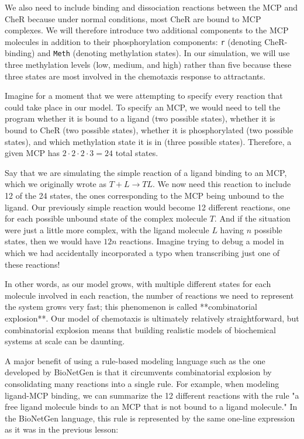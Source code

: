 We also need to include binding and dissociation reactions between the MCP and CheR because under normal conditions, most CheR are bound to MCP complexes.\citep{Lupas_1989} We will therefore introduce two additional components to the MCP molecules in addition to their phosphorylation components: \texttt{r} (denoting CheR-binding) and \texttt{Meth} (denoting methylation states). In our simulation, we will use three methylation levels (low, medium, and high) rather than five because these three states are most involved in the chemotaxis response to attractants.\citep{Boyd_1980}

Imagine for a moment that we were attempting to specify every reaction that could take place in our model. To specify an MCP, we would need to tell the program whether it is bound to a ligand (two possible states), whether it is bound to CheR (two possible states), whether it is phosphorylated (two possible states), and which methylation state it is in (three possible states). Therefore, a given MCP has $2 \cdot 2 \cdot 2 \cdot 3 = 24$ total states.

Say that we are simulating the simple reaction of a ligand binding to an MCP, which we originally wrote as $T + L \rightarrow TL$. We now need this reaction to include 12 of the 24 states, the ones corresponding to the MCP being unbound to the ligand. Our previously simple reaction would become 12 different reactions, one for each possible unbound state of the complex molecule $T$. And if the situation were just a little more complex, with the ligand molecule $L$ having $n$ possible states, then we would have $12n$ reactions. Imagine trying to debug a model in which we had accidentally incorporated a typo when transcribing just one of these reactions!

In other words, as our model grows, with multiple different states for each molecule involved in each reaction, the number of reactions we need to represent the system grows very fast; this phenomenon is called **combinatorial explosion**. Our model of chemotaxis is ultimately relatively straightforward, but combinatorial explosion means that building realistic models of biochemical systems at scale can be daunting.

A major benefit of using a rule-based modeling language such as the one developed by BioNetGen is that it circumvents combinatorial explosion by consolidating many reactions into a single rule. For example, when modeling ligand-MCP binding, we can summarize the 12 different reactions with the rule "a free ligand molecule binds to an MCP that is not bound to a ligand molecule." In the BioNetGen language, this rule is represented by the same one-line expression as it was in the previous lesson:

